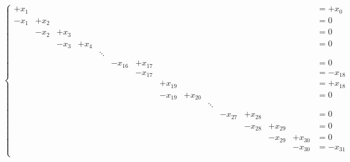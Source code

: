 \documentclass[A4,11pt]{article}
\begin{document}
$$
\left\{
\begin{array}{ccccccccccccccl}
       +x_1  &      &      &         &        &            &         &                   &            &        &            &         &         &                   &= +x_0 \\
        -x_1 & +x_2 &      &         &        &            &         &                   &            &        &            &         &         &                   &= 0 \\
             & -x_2 & +x_3 &         &        &            &         &                   &            &        &            &         &         &                   &= 0 \\
             &      & -x_3 & +x_4    &        &            &         &                   &            &        &            &         &         &                   &= 0 \\
             &      &      &         & \ddots &            &         &                   &            &        &            &         &         &                   &    \\
             &      &      &         &        &    -x_{16} & +x_{17} &                   &            &        &            &         &         &                   &= 0 \\
             &      &      &         &        &            & -x_{17} &                   &            &        &            &         &         &                   &= -x_{18} \\
             &      &      &         &        &            &         &           +x_{19} &            &        &            &         &         &                   &= +x_{18} \\
             &      &      &         &        &            &         &           -x_{19} & +x_{20}    &        &            &         &         &                   &= 0 \\
             &      &      &         &        &            &         &                   &            & \ddots &            &         &         &                   &    \\
             &      &      &         &        &            &         &                   &            &        &    -x_{27} & +x_{28} &         &                   &= 0 \\
             &      &      &         &        &            &         &                   &            &        &            & -x_{28} & +x_{29} &                   &= 0 \\
             &      &      &         &        &            &         &                   &            &        &            &         & -x_{29} & +x_{30}           &= 0 \\
             &      &      &         &        &            &         &                   &            &        &            &         &         & -x_{30}           &= -x_{31} \\
\end{array}
\right.
$$
\fi
\end{document}
